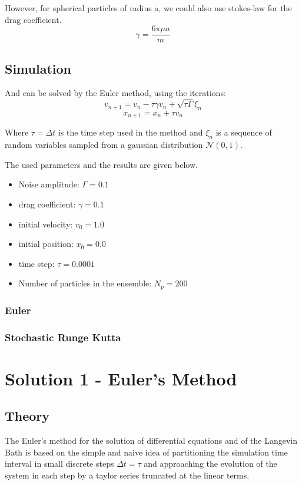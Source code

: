However, for spherical particles of radius a, we could also use stokes-law for the drag coefficient.
$$ \boxed{\gamma = \frac{6\pi \mu a}{m}} $$

\subsection{Simulation}
And can be solved by the Euler method, using the iterations:
$$ \boxed{v_{n+1} = v_{n} - \tau \gamma v_{n} + \sqrt{\tau\Gamma}\xi_{n}} $$
$$\boxed{ x_{n+1} = x_{n} + \tau v_{n} }$$

Where $\tau = \Delta t$ is the time step used in the method and $\xi_{n}$ is a sequence of random variables sampled from a gaussian distribution $\mathcal{N}(0,1)$. \par 
The used parameters and the results are given below.
\begin{itemize}
    \item Noise amplitude: $ \Gamma = 0.1 $
    \item drag coefficient: $ \gamma = 0.1 $
    \item initial velocity: $ v_{0} = 1.0 $
    \item initial position: $ x_{0} = 0.0 $
    \item time step: $ \tau = 0.0001 $
    \item Number of particles in the ensemble: $ N_{p} = 200 $
\end{itemize}

\subsubsection{Euler}

\subsubsection{Stochastic Runge Kutta}




\section{Solution 1 - Euler's Method} 

\subsection{Theory}
The Euler's method for the solution of differential equations and of the Langevin Bath is based on the simple and naive idea of partitioning the simulation time interval in small discrete steps $\Delta t = \tau$ and approaching the evolution of the system in each step by a taylor series truncated at the linear terms.

